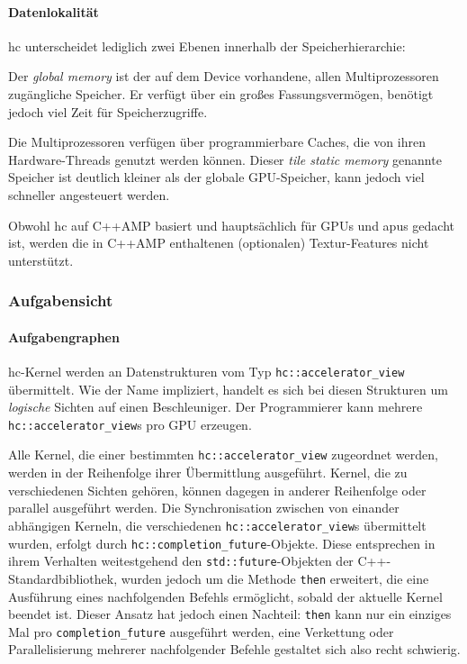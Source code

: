 \paragraph{Datenlokalität}

\gls{hc} unterscheidet lediglich zwei Ebenen innerhalb der Speicherhierarchie:

Der \textit{global memory} ist der auf dem Device vorhandene, allen
Multiprozessoren zugängliche Speicher. Er verfügt über ein großes
Fassungsvermögen, benötigt jedoch viel Zeit für Speicherzugriffe.

Die Multiprozessoren verfügen über programmierbare Caches, die von ihren
Hardware-Threads genutzt werden können. Dieser \textit{tile static memory}
genannte Speicher ist deutlich kleiner als der globale GPU-Speicher, kann jedoch
viel schneller angesteuert werden.

Obwohl \gls{hc} auf C++AMP basiert und hauptsächlich für GPUs und \gls{apu}s
gedacht ist, werden die in C++AMP enthaltenen (optionalen) Textur-Features nicht
unterstützt.

\subsubsection{Aufgabensicht}

\paragraph{Aufgabengraphen}

\gls{hc}-Kernel werden an Datenstrukturen vom Typ \texttt{hc::accelerator\_view}
übermittelt. Wie der Name impliziert, handelt es sich bei diesen Strukturen um
\textit{logische} Sichten auf einen Beschleuniger. Der Programmierer kann
mehrere \texttt{hc::accelerator\_view}s pro GPU erzeugen.

Alle Kernel, die einer bestimmten \texttt{hc::accelerator\_view} zugeordnet
werden, werden in der Reihenfolge ihrer Übermittlung ausgeführt. Kernel, die
zu verschiedenen Sichten gehören, können dagegen in anderer Reihenfolge oder
parallel ausgeführt werden. Die Synchronisation zwischen von einander abhängigen
Kerneln, die verschiedenen \texttt{hc::accelerator\_view}s übermittelt wurden,
erfolgt durch \texttt{hc::completion\_future}-Objekte. Diese entsprechen in
ihrem Verhalten weitestgehend den \texttt{std::future}-Objekten der
C++-Standardbibliothek, wurden jedoch um die Methode \texttt{then} erweitert,
die eine Ausführung eines nachfolgenden Befehls ermöglicht, sobald der aktuelle
Kernel beendet ist. Dieser Ansatz hat jedoch einen Nachteil: \texttt{then}
kann nur ein einziges Mal pro \texttt{completion\_future} ausgeführt werden,
eine Verkettung oder Parallelisierung mehrerer nachfolgender Befehle gestaltet
sich also recht schwierig.


